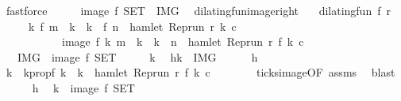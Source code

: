 \begin{isabellebody}
\ fastforce\isanewline
\ \ \isacommand{{\isacharbraceright}}\isamarkupfalse%
\ \isamarkupfalse%
\ {\isacartoucheopen}image\ f\ {\isacharquery}SET\ {\isasymsubseteq}\ {\isacharquery}IMG{\isacartoucheclose}\ \isacommand{{\isachardot}{\isachardot}}\isamarkupfalse%
\isanewline
{}\isamarkupfalse%
%
\endisatagproof
{\isafoldproof}%
%
\isadelimproof
\isanewline
%
\endisadelimproof
\isanewline
{}\isamarkupfalse%
\ dilating{\isacharunderscore}fun{\isacharunderscore}image{\isacharunderscore}right{\isacharcolon}\isanewline
\ \ \ {\isacartoucheopen}dilating{\isacharunderscore}fun\ f\ r{\isacartoucheclose}\isanewline
\ \ \ \ \ {\isacartoucheopen}{\isacharbraceleft}k{\isachardot}\ f\ m\ {\isacharless}\ k\ {\isasymand}\ k\ {\isasymle}\ f\ n\ {\isasymand}\ hamlet\ {\isacharparenleft}{\isacharparenleft}Rep{\isacharunderscore}run\ r{\isacharparenright}\ k\ c{\isacharparenright}{\isacharbraceright}\isanewline
\ \ \ \ \ \ \ \ \ \ {\isacharequal}\ image\ f\ {\isacharbraceleft}k{\isachardot}\ m\ {\isacharless}\ k\ {\isasymand}\ k\ {\isasymle}\ n\ {\isasymand}\ hamlet\ {\isacharparenleft}{\isacharparenleft}Rep{\isacharunderscore}run\ r{\isacharparenright}\ {\isacharparenleft}f\ k{\isacharparenright}\ c{\isacharparenright}{\isacharbraceright}{\isacartoucheclose}\isanewline
\ \ {\isacharparenleft}\ {\isacartoucheopen}{\isacharquery}IMG\ {\isacharequal}\ image\ f\ {\isacharquery}SET{\isacartoucheclose}{\isacharparenright}\isanewline
%
\isadelimproof
%
\endisadelimproof
%
\isatagproof
{}\isamarkupfalse%
\isanewline
\ \ \isacommand{{\isacharbraceleft}}\isamarkupfalse%
\ \isamarkupfalse%
\ k\ \isamarkupfalse%
\ h{\isacharcolon}{\isacartoucheopen}k\ {\isasymin}\ {\isacharquery}IMG{\isacartoucheclose}\isanewline
\ \ \ \ \isamarkupfalse%
\ h\ \isamarkupfalse%
\ k\ \ k{}prop{\isacharcolon}{\isacartoucheopen}f\ k\ {\isacharequal}\ k\ {\isasymand}\ hamlet\ {\isacharparenleft}{\isacharparenleft}Rep{\isacharunderscore}run\ r{\isacharparenright}\ {\isacharparenleft}f\ k\ c{\isacharparenright}{\isacartoucheclose}\isanewline
\ \ \ \ \ \ \isamarkupfalse%
\ ticks{\isacharunderscore}image{\isacharbrackleft}OF\ assms{\isacharbrackright}\ \isamarkupfalse%
\ blast\isanewline
\ \ \ \ \isamarkupfalse%
\ h\ \isamarkupfalse%
\ {\isacartoucheopen}k\ {\isasymin}\ image\ f\ {\isacharquery}SET{\isacartoucheclose}\isanewline

\end{isabellebody}
